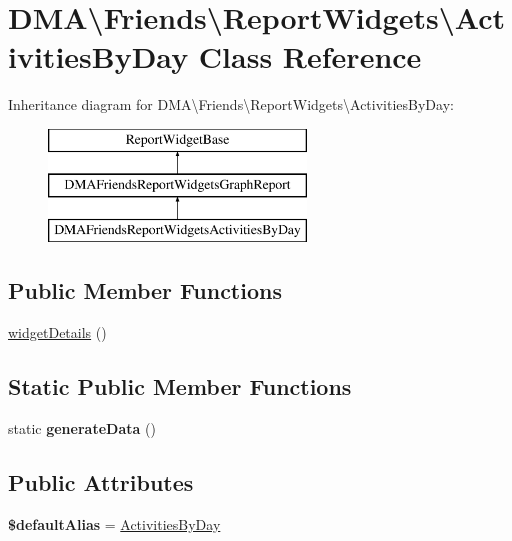 \hypertarget{classDMA_1_1Friends_1_1ReportWidgets_1_1ActivitiesByDay}{}\section{D\+M\+A\textbackslash{}Friends\textbackslash{}Report\+Widgets\textbackslash{}Activities\+By\+Day Class Reference}
\label{classDMA_1_1Friends_1_1ReportWidgets_1_1ActivitiesByDay}
Inheritance diagram for D\+M\+A\textbackslash{}Friends\textbackslash{}Report\+Widgets\textbackslash{}Activities\+By\+Day\+:\begin{figure}[H]
\begin{center}
\leavevmode
\includegraphics[height=3.000000cm]{d4/d1a/classDMA_1_1Friends_1_1ReportWidgets_1_1ActivitiesByDay}
\end{center}
\end{figure}
\subsection*{Public Member Functions}
\begin{DoxyCompactItemize}
\item 
\hyperlink{classDMA_1_1Friends_1_1ReportWidgets_1_1ActivitiesByDay_a4ebe03184ffd39cdc0873ae789c16d0b}{widget\+Details} ()
\end{DoxyCompactItemize}
\subsection*{Static Public Member Functions}
\begin{DoxyCompactItemize}
\item 
\hypertarget{classDMA_1_1Friends_1_1ReportWidgets_1_1ActivitiesByDay_a0747691bd0e02236430b6a7e63995206}{}static {\bfseries generate\+Data} ()\label{classDMA_1_1Friends_1_1ReportWidgets_1_1ActivitiesByDay_a0747691bd0e02236430b6a7e63995206}

\end{DoxyCompactItemize}
\subsection*{Public Attributes}
\begin{DoxyCompactItemize}
\item 
\hypertarget{classDMA_1_1Friends_1_1ReportWidgets_1_1ActivitiesByDay_a48b477a325c311b36a12157c4e8ba735}{}{\bfseries \$default\+Alias} = \textquotesingle{}\hyperlink{classDMA_1_1Friends_1_1ReportWidgets_1_1ActivitiesByDay}{Activities\+By\+Day}\textquotesingle{}\label{classDMA_1_1Friends_1_1ReportWidgets_1_1ActivitiesByDay_a48b477a325c311b36a12157c4e8ba735}

\end{DoxyCompactItemize}
